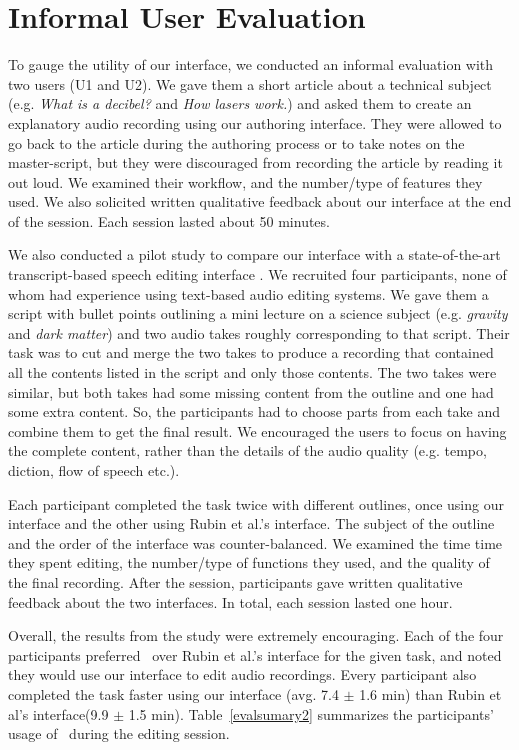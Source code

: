 \section{Informal User Evaluation}

To gauge the utility of our interface, we conducted an informal evaluation with two users (U1 and U2). We gave them a short article about a technical subject (e.g. \textit{What is a decibel?} and \textit{How lasers work.}) and asked them to create an explanatory audio recording using our authoring interface. They were allowed to go back to the article during the authoring process or to take notes on the master-script, but they were discouraged from recording the article by reading it out loud. We examined their workflow, and the number/type of features they used. We also solicited written qualitative feedback about our interface at the end of the session. Each session lasted about 50 minutes.




We also conducted a pilot study to compare our interface with a state-of-the-art transcript-based speech editing interface \cite{rubin2013content}.  We recruited four participants, none of whom had experience using text-based audio editing systems. We gave them a script with bullet points outlining a mini lecture on a science subject (e.g. \textit{gravity} and \textit{dark matter}) and two audio takes roughly corresponding to that script. Their task was to cut and merge the two takes to produce a recording that contained all the contents listed in the script and only those contents. The two takes were similar, but both takes had some
missing content from the outline and one had some extra
content. So, the participants had to choose parts from each take and combine them to get the final result. We encouraged the users to focus on having the complete content, rather than the details of the audio quality (e.g. tempo, diction, flow of speech etc.). 

Each participant completed the task twice with different outlines, once using our interface and the other using Rubin et al.'s interface. The subject of the outline and the order of the interface was counter-balanced. We examined the time time they spent editing, the number/type of functions they used, and the quality of the final recording. After the session, participants gave written qualitative feedback about the two interfaces. In total, each session lasted one hour.
   
Overall, the results from the study were extremely encouraging. Each of the four participants preferred \systemname\ over Rubin et al.'s interface for the given task, and noted they would use our interface to edit audio recordings. Every participant also completed the task faster using our interface (avg. 7.4 $\pm$ 1.6 min) than Rubin et al's interface(9.9 $\pm$ 1.5 min). Table~\ref{evalsumary2} summarizes the participants' usage of \systemname\ during the editing session.


